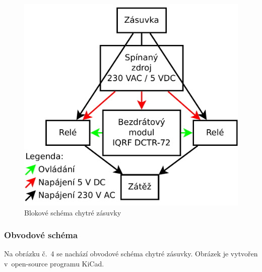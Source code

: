 \documentclass[12pt,a4paper,oneside]{article}
\begin{document}
\begin{figure}[H]
\centering
\label{fig:blokove-schema-zasuvky}
\includegraphics[width = 128mm]{../img/blokove-schema/zasuvka.pdf}
\caption{Blokové schéma chytré zásuvky}
\end{figure}

\newpage

\subsubsection{Obvodové schéma}

Na obrázku č.~4 se nachází obvodové schéma chytré zásuvky. Obrázek je vytvořen v~open-source programu KiCad\cite{sw/kicad}.
\end{document}
